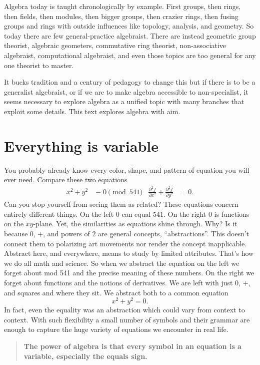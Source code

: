 Algebra today is taught chronologically by example. 
First groups, then rings, then fields, then modules,
then bigger groups, then crazier rings, then fusing groups and rings with
outside influences like topology, analysis, and geometry.  So today there are
few general-practice algebraist.  There are instead geometric group theorist,
algebraic geometers, commutative ring theorist, non-associative algebraist,
computational algebraist, and even those topics are too general for any one
theorist to master.  

It bucks tradition and a century of pedagogy to change this 
but if there is to be a generalist algebraist, or if we are to make 
algebra accessible to non-specialist, it seems necessary to explore algebra 
as a unified topic with many branches that exploit some details.
This text explores algebra with aim.

\section{Everything is variable}
You probably already know every color, shape, and pattern of 
equation you will ever need.  Compare these two equations
\begin{align*}
    x^2+y^2 & \equiv 0 \pmod{541} 
    & 
    \frac{\partial^2 f}{\partial x^2}+\frac{\partial^2 f}{\partial y^2} & =0.
\end{align*}
Can you stop yourself from seeing them as related?
These equations concern entirely different things.  On the left $0$ can 
equal 541.  On the right $0$ is functions on the $xy$-plane.
Yet, the similarities as equations shine through.  Why? Is it because $0$, 
$+$, and  powers of $2$ are general concepts, ``abstractions''.  This doesn't connect them to
polarizing art movements nor render the concept inapplicable.  Abstract here,
and everywhere, means to study by limited attributes.  That's how we do all
math and science.  So when we abstract the equation on the left we forget
about mod 541 and the precise meaning of these numbers.  On the right we forget
about functions and the notions of derivatives.  We are left with just $0$, 
$+$, and squares and where they sit.  We abstract both to a common equation
\[
    x^2+y^2=0.
\]
In fact, even the equality was an abstraction which could vary from context to context.
With such flexibility a small number of symbols and their grammar are enough to capture 
the huge variety of equations we encounter in real life.

\begin{quote}
    \textbf{The power of algebra is that every symbol 
    in an equation is a variable, especially the equals sign.}
\end{quote}


